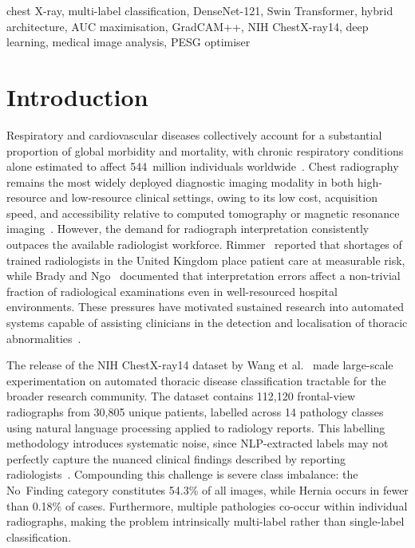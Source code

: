 \documentclass[conference]{IEEEtran}
\begin{document}
\begin{IEEEkeywords}
chest X-ray, multi-label classification, DenseNet-121, Swin Transformer,
hybrid architecture, AUC maximisation, GradCAM++, NIH ChestX-ray14,
deep learning, medical image analysis, PESG optimiser
\end{IEEEkeywords}

\section{Introduction}

Respiratory and cardiovascular diseases collectively account for a
substantial proportion of global morbidity and mortality, with chronic
respiratory conditions alone estimated to affect 544~million individuals
worldwide~\cite{gbd2019}. Chest radiography remains the most widely
deployed diagnostic imaging modality in both high-resource and
low-resource clinical settings, owing to its low cost, acquisition
speed, and accessibility relative to computed tomography or magnetic
resonance imaging~\cite{raoof2012}. However, the demand for radiograph
interpretation consistently outpaces the available radiologist
workforce. Rimmer~\cite{rimmer2017} reported that shortages of trained
radiologists in the United Kingdom place patient care at measurable
risk, while Brady and Ngo~\cite{brady2015} documented that
interpretation errors affect a non-trivial fraction of radiological
examinations even in well-resourced hospital environments. These
pressures have motivated sustained research into automated systems
capable of assisting clinicians in the detection and localisation of
thoracic abnormalities~\cite{litjens2017}.

The release of the NIH ChestX-ray14 dataset by Wang
et al.~\cite{wang2017} made large-scale experimentation on automated
thoracic disease classification tractable for the broader research
community. The dataset contains 112,120 frontal-view radiographs from
30,805 unique patients, labelled across 14 pathology classes using
natural language processing applied to radiology reports. This labelling
methodology introduces systematic noise, since NLP-extracted labels may
not perfectly capture the nuanced clinical findings described by
reporting radiologists~\cite{baltruschat2019}. Compounding this
challenge is severe class imbalance: the No~Finding category constitutes
54.3\% of all images, while Hernia occurs in fewer than 0.18\% of
cases. Furthermore, multiple pathologies co-occur within individual
radiographs, making the problem intrinsically multi-label rather than
single-label classification.
\end{document}
